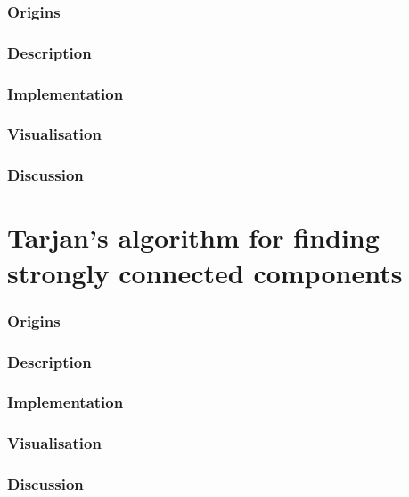 \documentclass{l4proj}
\begin{document}
\subsubsection{Origins}

\subsubsection{Description}

\subsubsection{Implementation}

\subsubsection{Visualisation}

\subsubsection{Discussion}

\section{Tarjan's algorithm for finding strongly connected components}

\subsubsection{Origins}

\subsubsection{Description}

\subsubsection{Implementation}

\subsubsection{Visualisation}

\subsubsection{Discussion}
\end{document}
